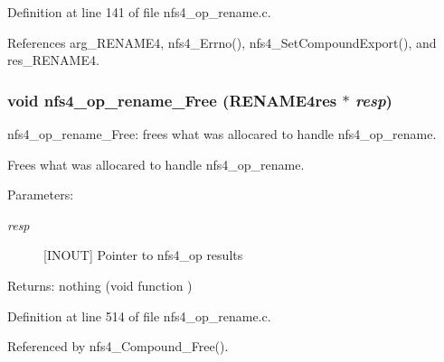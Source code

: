 Definition at line 141 of file nfs4\_\-op\_\-rename.c.

References arg\_\-RENAME4, nfs4\_\-Errno(), nfs4\_\-Set\-Compound\-Export(), and res\_\-RENAME4.
\subsubsection{\setlength{\rightskip}{0pt plus 5cm}void nfs4\_\-op\_\-rename\_\-Free (RENAME4res $\ast$ {\em resp})}\label{nfs4__op__rename_8c_a3}


nfs4\_\-op\_\-rename\_\-Free: frees what was allocared to handle nfs4\_\-op\_\-rename.

Frees what was allocared to handle nfs4\_\-op\_\-rename.

\begin{Desc}
\item[Parameters:]
\begin{description}
\item[{\em resp}][INOUT] Pointer to nfs4\_\-op results\end{description}
\end{Desc}
\begin{Desc}
\item[Returns:]nothing (void function ) \end{Desc}


Definition at line 514 of file nfs4\_\-op\_\-rename.c.

Referenced by nfs4\_\-Compound\_\-Free().